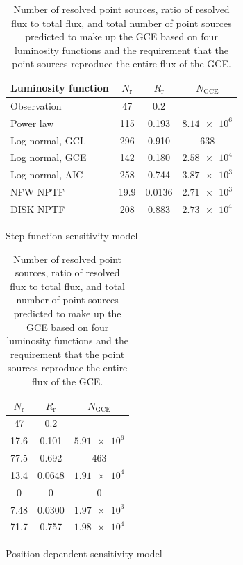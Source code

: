 \documentclass[a4paper,11pt]{article}
\begin{document}
\begin{table}
    \centering
    \begin{subtable}[h]{0.55\textwidth}
        \begin{tabular}{|l|c|c|c|}
            \hline
            Luminosity function & $N_\text{r}$ & $R_\text{r}$ & $N_\text{GCE}$\\ \hline \hline
            Observation & 47 & 0.2 & \\ \hline
            Power law & 115 & 0.193 & $\num{8.14e6}$ \\
            Log normal, GCL & 296 & 0.910 & 638 \\
            Log normal, GCE & 142 & 0.180 & $\num{2.58e4}$ \\
            Log normal, AIC & 258 & 0.744 & $\num{3.87e3}$ \\
            NFW NPTF & 19.9 & 0.0136 & $\num{2.71e3}$ \\
            DISK NPTF & 208 & 0.883 & $\num{2.73e4}$ \\
            \hline
        \end{tabular}
        \caption{Step function sensitivity model}
        \label{tab:step-function-results}
    \end{subtable}
    \hfill
    \begin{subtable}[h]{0.44\textwidth}
        \begin{tabular}{|c|c|c|}
            \hline
            $N_\text{r}$ & $R_\text{r}$ & $N_\text{GCE}$\\ \hline \hline
            47 & 0.2 & \\ \hline
            17.6 & 0.101 & $\num{5.91e6}$ \\
            77.5 & 0.692 & 463 \\
            13.4 & 0.0648 & $\num{1.91e4}$ \\
            0 & 0 & $\num{0}$ \\
            7.48 & 0.0300 & $\num{1.97e3}$ \\
            71.7 & 0.757 & $\num{1.98e4}$ \\
            \hline
        \end{tabular}
        \caption{Position-dependent sensitivity model}
        \label{tab:position-dependent-results}
    \end{subtable}
    \caption{Number of resolved point sources, ratio of resolved flux to total flux, and total number of point sources predicted to make up the GCE based on four luminosity functions and the requirement that the point sources reproduce the entire flux of the GCE.}
\end{table}
\end{document}
